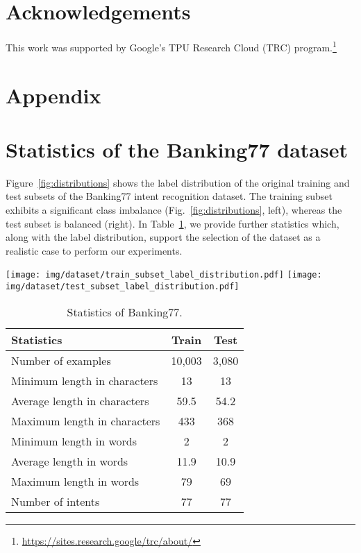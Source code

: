 \documentclass[11pt]{article}
\begin{document}
\section*{Acknowledgements}
This work was supported by Google’s TPU Research Cloud (TRC) program.\footnote{\url{https://sites.research.google/trc/about/}}





\appendix
\section*{Appendix}

\section{Statistics of the Banking77 dataset}
\label{sec:datastats}
Figure~\ref{fig:distributions} shows the label distribution of the original training and test subsets of the Banking77 intent recognition dataset. The training subset exhibits a significant class imbalance (Fig.~\ref{fig:distributions}, left), whereas the test subset is balanced (right). In Table~\ref{tab:banking77-stats}, we provide further statistics which, along with the label distribution, support the selection of the dataset as a realistic case to perform our experiments.

\begin{figure*}[!hbtp]
    \centering
    \texttt{[image: img/dataset/train\_subset\_label\_distribution.pdf]}
    \texttt{[image: img/dataset/test\_subset\_label\_distribution.pdf]}
    \vspace{-1mm}
    \caption{Label distribution of the original train (left) and test (right) subsets of Banking77.}
    \label{fig:distributions}
\end{figure*}

\begin{table}[!htpb]
\centering
\small
    \begin{tabular}{|l|c|c|}
    \hline
    \textbf{Statistics} & \textbf{Train} & \textbf{Test} \\
    \hline
        Number of examples & 10,003 & 3,080 \\
        \hline
        Minimum length in characters & 13 & 13 \\
        Average length in characters & 59.5 & 54.2 \\
        Maximum length in characters & 433 & 368 \\
        \hline
        Minimum length in words & 2 & 2 \\
        Average length in words & 11.9 & 10.9 \\
        Maximum length in words & 79 & 69 \\
        \hline
        Number of intents & 77 & 77 \\
    \hline
    \end{tabular}
    \vspace{-1mm}
\caption{Statistics of Banking77.}
\label{tab:banking77-stats}
\end{table}
\end{document}
